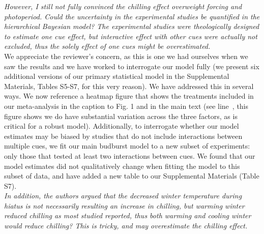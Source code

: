 \documentclass{article}
\newcommand{\lr}[1]{line~\lineref{#1}}
\begin{document}
\emph{However, I still not fully convinced the chilling effect overweight forcing and photoperiod. Could the uncertainty in the experimental studies be quantified in the hierarchical Bayesian model? The experimental studies were theologically designed to estimate one cue effect, but interactive effect with other cues were actually not excluded, thus the solely effect of one cues might be overestimated.}\\ 


We appreciate the reviewer's concern, as this is one we had ourselves when we saw the results and we have worked to interrogate our model fully (we present six additional versions of our primary statistical model in the Supplemental Materials, Tables S5-S7, for this very reason). We have addressed this in several ways. We now reference a heatmap figure that shows the treatments included in our meta-analysis in the caption to Fig. 1 and in the main text (see \lr{heatmap}, this figure shows we do have substantial variation across the three factors, as is critical for a robust model). Additionally, to interrogate whether our model estimates may be biased by studies that do not include interactions between multiple cues, we fit our main budburst model to a new subset of experiments: only those that tested at least two interactions between cues. We found that our model estimates did not qualitatively change when fitting the model to this subset of data, and have added a new table to our Supplemental Materials (Table S7).\\

\emph{In addition, the authors argued that the decreased winter temperature during hiatus is not necessarily resulting an increase in chilling, but warming winter reduced chilling as most studied reported, thus both warming and cooling winter would reduce chilling? This is tricky, and may overestimate the chilling effect.}\\
\end{document}
